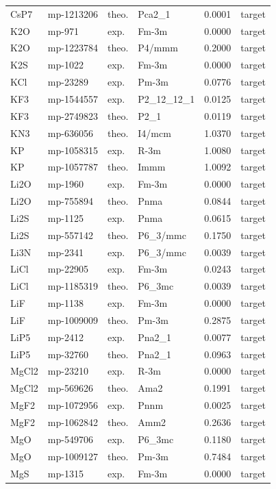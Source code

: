 \begin{longtable}{@{}lllllr@{}}
CsP7 & mp-1213206 & theo. & Pca2\_1 & 0.0001 & target \\
K2O & mp-971 & exp. & Fm-3m & 0.0000 & target \\
K2O & mp-1223784 & theo. & P4/mmm & 0.2000 & target \\
K2S & mp-1022 & exp. & Fm-3m & 0.0000 & target \\
KCl & mp-23289 & exp. & Pm-3m & 0.0776 & target \\
KF3 & mp-1544557 & exp. & P2\_12\_12\_1 & 0.0125 & target \\
KF3 & mp-2749823 & theo. & P2\_1 & 0.0119 & target \\
KN3 & mp-636056 & theo. & I4/mcm & 1.0370 & target \\
KP & mp-1058315 & exp. & R-3m & 1.0080 & target \\
KP & mp-1057787 & theo. & Immm & 1.0092 & target \\
Li2O & mp-1960 & exp. & Fm-3m & 0.0000 & target \\
Li2O & mp-755894 & theo. & Pnma & 0.0844 & target \\
Li2S & mp-1125 & exp. & Pnma & 0.0615 & target \\
Li2S & mp-557142 & theo. & P6\_3/mmc & 0.1750 & target \\
Li3N & mp-2341 & exp. & P6\_3/mmc & 0.0039 & target \\
LiCl & mp-22905 & exp. & Fm-3m & 0.0243 & target \\
LiCl & mp-1185319 & theo. & P6\_3mc & 0.0039 & target \\
LiF & mp-1138 & exp. & Fm-3m & 0.0000 & target \\
LiF & mp-1009009 & theo. & Pm-3m & 0.2875 & target \\
LiP5 & mp-2412 & exp. & Pna2\_1 & 0.0077 & target \\
LiP5 & mp-32760 & theo. & Pna2\_1 & 0.0963 & target \\
MgCl2 & mp-23210 & exp. & R-3m & 0.0000 & target \\
MgCl2 & mp-569626 & theo. & Ama2 & 0.1991 & target \\
MgF2 & mp-1072956 & exp. & Pnnm & 0.0025 & target \\
MgF2 & mp-1062842 & theo. & Amm2 & 0.2636 & target \\
MgO & mp-549706 & exp. & P6\_3mc & 0.1180 & target \\
MgO & mp-1009127 & theo. & Pm-3m & 0.7484 & target \\
MgS & mp-1315 & exp. & Fm-3m & 0.0000 & target \\

\end{longtable}
